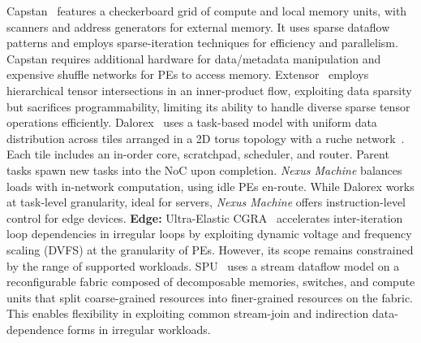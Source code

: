 Capstan~\cite{capstan} features a checkerboard grid of compute and local memory units, with scanners and address generators for external memory. It uses sparse dataflow patterns and employs sparse-iteration techniques for efficiency and parallelism. Capstan requires additional hardware for data/metadata manipulation and expensive shuffle networks for PEs to access memory.
Extensor~\cite{extensor} employs hierarchical tensor intersections in an inner-product flow, exploiting data sparsity but sacrifices programmability, limiting its ability to handle diverse sparse tensor operations efficiently.
Dalorex~\cite{dalorex} uses a task-based model with uniform data distribution across tiles arranged in a 2D torus topology with a ruche network~\cite{ruche}. Each tile includes an in-order core, scratchpad, scheduler, and router. Parent tasks spawn new tasks into the NoC upon completion.
\textit{Nexus Machine} balances loads with in-network computation, using idle PEs en-route. While Dalorex works at task-level granularity, ideal for servers, \textit{Nexus Machine} offers instruction-level control for edge devices.
\textbf{Edge:}
Ultra-Elastic CGRA~\cite{uecgra} accelerates inter-iteration loop dependencies in irregular loops by exploiting dynamic voltage and frequency scaling (DVFS) at the granularity of PEs. However, its scope remains constrained by the range of supported workloads.
SPU~\cite{dgra} uses a stream dataflow model on a reconfigurable fabric composed of decomposable memories, switches, and compute units that split coarse-grained resources into finer-grained resources on the fabric. This enables flexibility in exploiting common stream-join and indirection data-dependence forms in irregular workloads.
